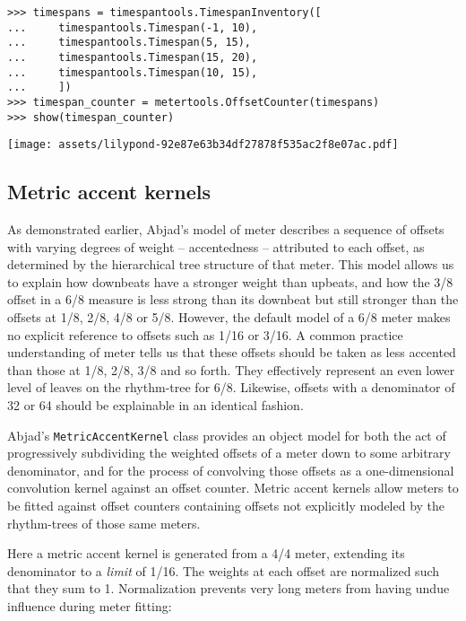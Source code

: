 \begin{abjadbookoutput}
\begin{singlespacing}
\vspace{-0.5\baselineskip}
\begin{lstlisting}
>>> timespans = timespantools.TimespanInventory([
...     timespantools.Timespan(-1, 10),
...     timespantools.Timespan(5, 15),
...     timespantools.Timespan(15, 20),
...     timespantools.Timespan(10, 15),
...     ])
>>> timespan_counter = metertools.OffsetCounter(timespans)
>>> show(timespan_counter)
\end{lstlisting}
\noindent\texttt{[image: assets/lilypond-92e87e63b34df27878f535ac2f8e07ac.pdf]}
\end{singlespacing}
\end{abjadbookoutput}

\subsection{Metric accent kernels} %

As demonstrated earlier, Abjad's model of meter describes a sequence of offsets
with varying degrees of weight -- accentedness -- attributed to each offset, as
determined by the hierarchical tree structure of that meter. This model allows
us to explain how downbeats have a stronger weight than upbeats, and how the
3/8 offset in a 6/8 measure is less strong than its downbeat but still stronger
than the offsets at 1/8, 2/8, 4/8 or 5/8. However, the default model of a 6/8
meter makes no explicit reference to offsets such as 1/16 or 3/16. A common
practice understanding of meter tells us that these offsets should be taken as
less accented than those at 1/8, 2/8, 3/8 and so forth. They effectively
represent an even lower level of leaves on the rhythm-tree for 6/8. Likewise,
offsets with a denominator of 32 or 64 should be explainable in an identical
fashion.

Abjad's \texttt{MetricAccentKernel} class provides an object model for both the
act of progressively subdividing the weighted offsets of a meter down to some
arbitrary denominator, and for the process of convolving those offsets as a
one-dimensional convolution kernel against an offset counter. Metric accent
kernels allow meters to be fitted against offset counters containing offsets
not explicitly modeled by the rhythm-trees of those same meters.

Here a metric accent kernel is generated from a 4/4 meter, extending its
denominator to a \emph{limit} of 1/16. The weights at each offset are
normalized such that they sum to 1. Normalization prevents very long meters
from having undue influence during meter fitting:

